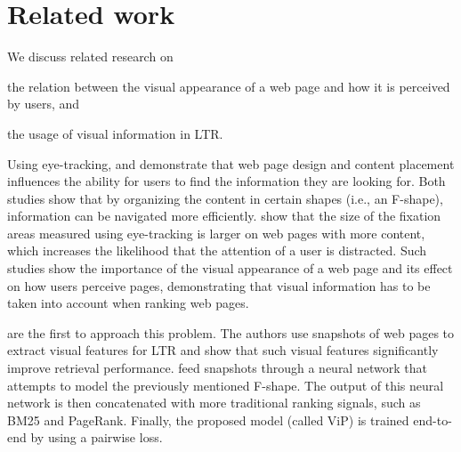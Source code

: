
\section{Related work}
\label{sec:relatedwork}

We discuss related research on
\begin{inparaenum}[(i)]
\item the relation between the visual appearance of a web page and how it is perceived by users, and
\item the usage of visual information in \ac{LTR}.
\end{inparaenum} 


Using eye-tracking, \citet{nielsen2006f} and \citet{pernice2017f} demonstrate that web page design and content placement influences the ability for users to find the information they are looking for. 
Both studies show that by organizing the content in certain shapes (i.e., an F-shape), information can be  navigated more efficiently.
\citet{wang2014eye} show that the size of the fixation areas measured using eye-tracking is larger on web pages with more content, which increases the likelihood that the attention of a user is distracted.
Such studies show the importance of the visual appearance of a web page and its effect on how users perceive pages, demonstrating that visual information has to be taken into account when ranking web pages.

\citet{fan2017learning} are the first to approach this problem.
The authors use snapshots of web pages to extract visual features for LTR
and show that such visual features significantly improve retrieval performance.
\citet{fan2017learning} feed snapshots through a neural network that attempts to model the previously mentioned F-shape.
The output of this neural network is then concatenated with more traditional ranking signals, such as BM25 and PageRank.
Finally, the proposed model (called ViP) is trained end-to-end by using a pairwise loss.

